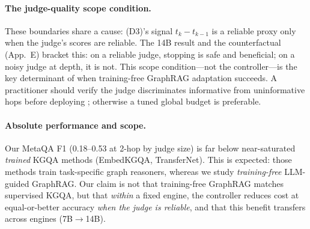 \paragraph{The judge-quality scope condition.}
These boundaries share a cause: (D3)'s signal $t_k - t_{k-1}$ is a reliable proxy only when the judge's scores are reliable. The 14B result and the counterfactual (App.~E) bracket this: on a reliable judge, stopping is safe and beneficial; on a noisy judge at depth, it is not. This scope condition---not the controller---is the key determinant of when training-free GraphRAG adaptation succeeds. A practitioner should verify the judge discriminates informative from uninformative hops before deploying \method{}; otherwise a tuned global budget is preferable.

\paragraph{Absolute performance and scope.}
Our MetaQA F1 (0.18--0.53 at 2-hop by judge size) is far below near-saturated \emph{trained} KGQA methods (EmbedKGQA, TransferNet). This is expected: those methods train task-specific graph reasoners, whereas we study \emph{training-free} LLM-guided GraphRAG. Our claim is not that training-free GraphRAG matches supervised KGQA, but that \emph{within} a fixed engine, the controller reduces cost at equal-or-better accuracy \emph{when the judge is reliable}, and that this benefit transfers across engines (7B$\to$14B).
